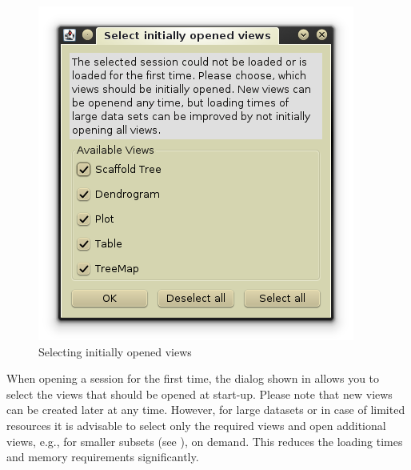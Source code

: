 \begin{figure}[ht]
   \centering
   \includegraphics[width=.35\textwidth]{images/sh_initial_views.png}
   \caption{Selecting initially opened views}
   \label{fig:initial_views}
\end{figure}

When opening a session for the first time, the dialog shown in  allows you to select the views that should be opened at start-up. Please note that new views can be created later at any time. However, for large datasets or in case of limited resources it is advisable to select only the required views and open additional views, e.g., for smaller subsets (see ), on demand.
This reduces the loading times and memory requirements significantly.